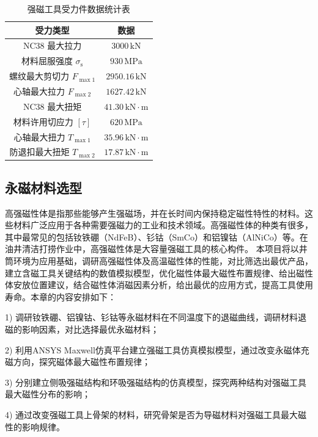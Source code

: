 \begin{table}[htbp]
    \centering
    \caption{强磁工具受力件数据统计表}
    \label{tab:mag_tool_force_data}
    \renewcommand{\arraystretch}{1.5} %
    \begin{tabularx}{.9\textwidth}{CC}
        \toprule
        受力类型 & 数据 \\
        \midrule
        NC38 最大拉力 & $3000\,\text{kN}$ \\
        材料屈服强度 $\sigma_{\mathrm{s}}$ & $930\,\text{MPa}$ \\
        螺纹最大剪切力 $F_{\max1}$ & $2950.16\,\text{kN}$ \\
        心轴最大拉力 $F_{\max2}$ & $1627.42\,\text{kN}$ \\
        NC38 最大扭矩 & $41.30\,\text{kN}\cdot\text{m}$ \\
        材料许用切应力 $[\tau]$ & $620\,\text{MPa}$ \\
        心轴最大扭力 $T_{\max1}$ & $35.96\,\text{kN}\cdot\text{m}$ \\
        防退扣最大扭矩 $T_{\max2}$ & $17.87\,\text{kN}\cdot\text{m}$ \\
        \bottomrule
    \end{tabularx}
\end{table}


\subsection{永磁材料选型}
\label{citimoni}
高强磁性体是指那些能够产生强磁场，并在长时间内保持稳定磁性特性的材料。这些材料广泛应用于各种需要强磁力的工业和技术领域。高强磁性体的种类有很多，其中最常见的包括钕铁硼（NdFeB）、钐钴（SmCo）和铝镍钴（AlNiCo）等。在油井清洁打捞作业中，高强磁性体是大容量强磁工具的核心构件。
本项目将以井筒环境为应用基础，调研高强磁性体及高温磁性体的性能，对比筛选出最优产品，建立含磁工具关键结构的数值模拟模型，优化磁性体最大磁性布置规律、给出磁性体安放位置建议，结合磁性体消磁因素分析，给出最优的应用方式，提高工具使用寿命。本章的内容安排如下：

1) 调研钕铁硼、铝镍钴、钐钴等永磁材料在不同温度下的退磁曲线，调研材料退磁的影响因素，对比选择最优永磁材料；

2) 利用ANSYS Maxwell仿真平台建立强磁工具仿真模拟模型，通过改变永磁体充磁方向，探究磁体最大磁性布置规律；

3) 分别建立侧吸强磁结构和环吸强磁结构的仿真模型，探究两种结构对强磁工具最大磁性分布的影响；

4) 通过改变强磁工具上骨架的材料，研究骨架是否为导磁材料对强磁工具最大磁性的影响规律。


